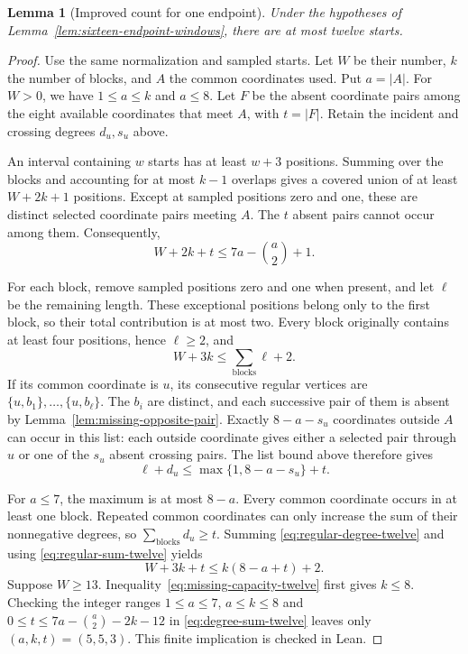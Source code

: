 \documentclass[11pt,a4paper]{article}
\newtheorem{lemma}[theorem]{Lemma}
\theoremstyle{definition}
\theoremstyle{remark}
\begin{document}
\begin{lemma}[Improved count for one endpoint]\label{lem:twelve-endpoint-windows}
Under the hypotheses of Lemma~\ref{lem:sixteen-endpoint-windows}, there are
at most twelve starts.
\end{lemma}
\begin{proof}
Use the same normalization and sampled starts. Let $W$ be their number,
$k$ the number of blocks, and $A$ the common coordinates used. Put $a=|A|$.
For $W>0$, we have $1\le a\le k$ and $a\le8$. Let $F$ be the absent
coordinate pairs among the eight available coordinates that meet $A$, with
$t=|F|$. Retain the incident and crossing degrees $d_u,s_u$ above.

An interval containing $w$ starts has at least $w+3$ positions. Summing
over the blocks and accounting for at most $k-1$ overlaps gives a covered
union of at least $W+2k+1$ positions. Except at sampled positions zero and
one, these are distinct selected coordinate pairs meeting $A$. The $t$
absent pairs cannot occur among them. Consequently,
\begin{equation}\label{eq:missing-capacity-twelve}
W+2k+t\le7a-\binom a2+1.
\end{equation}

For each block, remove sampled positions zero and one when present, and
let $\ell$ be the remaining length. These exceptional positions belong
only to the first block, so their total contribution is at most two.
Every block originally contains at least four positions, hence $\ell\ge2$,
and
\begin{equation}\label{eq:regular-sum-twelve}
W+3k\le\sum_{\text{blocks}}\ell+2.
\end{equation}
If its common coordinate is $u$, its consecutive regular vertices are
$\{u,b_1\},\ldots,\{u,b_\ell\}$. The $b_i$ are distinct, and each
successive pair of them is absent by Lemma~\ref{lem:missing-opposite-pair}.
Exactly $8-a-s_u$ coordinates outside $A$ can occur in this list: each
outside coordinate gives either a selected pair through $u$ or one of
the $s_u$ absent crossing pairs. The list bound above therefore gives
\begin{equation}\label{eq:regular-degree-twelve}
\ell+d_u\le\max\{1,8-a-s_u\}+t.
\end{equation}

For $a\le7$, the maximum is at most $8-a$. Every common coordinate occurs
in at least one block. Repeated common coordinates can only increase the
sum of their nonnegative degrees, so $\sum_{\text{blocks}}d_u\ge t$.
Summing \eqref{eq:regular-degree-twelve} and using
\eqref{eq:regular-sum-twelve} yields
\begin{equation}\label{eq:degree-sum-twelve}
W+3k+t\le k(8-a+t)+2.
\end{equation}
Suppose $W\ge13$. Inequality~\eqref{eq:missing-capacity-twelve} first gives
$k\le8$. Checking the integer ranges $1\le a\le7$, $a\le k\le8$ and
$0\le t\le7a-\binom a2-2k-12$ in
\eqref{eq:degree-sum-twelve} leaves only $(a,k,t)=(5,5,3)$.
This finite implication is checked in Lean.


\end{proof}
\end{document}
